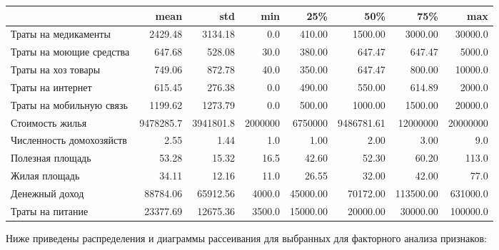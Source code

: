 \documentclass[12pt]{report}
\begin{document}
\begin{table}[H]
  \centering
  \begin{tabular}{lrrrrrrr}
    \toprule
    {} &        mean &         std &        min &         25\% &         50\% &         75\% &         max \\
    \midrule
    Траты на медикаменты       &     2429.48 &     3134.18 &        0.0 &      410.00 &     1500.00 &     3000.00 &     30000.0 \\
    Траты на моющие средства &      647.68 &      528.08 &       30.0 &      380.00 &      647.47 &      647.47 &      5000.0 \\
    Траты на хоз товары &      749.06 &      872.78 &       40.0 &      350.00 &      647.47 &      800.00 &     10000.0 \\
    Траты на интернет                                       &      615.45 &      276.38 &        0.0 &      490.00 &      550.00 &      614.89 &      2000.0 \\
    Траты на мобильную связь                         &     1199.62 &     1273.79 &        0.0 &      500.00 &     1000.00 &     1500.00 &     20000.0 \\
    Стоимость жилья                                  &  9478285.7 &  3941801.8 &  2000000 &  6750000 &  9486781.61 &  12000000 &  20000000 \\
    Численность домохозяйств                                          &        2.55 &        1.44 &        1.0 &        1.00 &        2.00 &        3.00 &         9.0 \\
    Полезная площадь &       53.28 &       15.32 &       16.5 &       42.60 &       52.30 &       60.20 &       113.0 \\
    Жилая площадь &       34.11 &       12.16 &       11.0 &       26.55 &       32.00 &       42.00 &        77.0 \\
    Денежный доход                                                                                       &    88784.06 &    65912.56 &     4000.0 &    45000.00 &    70172.00 &   113500.00 &    631000.0 \\
    Траты на питание &    23377.69 &    12675.36 &     3500.0 &    15000.00 &    20000.00 &    30000.00 &    100000.0 \\
    \bottomrule
    \end{tabular}
\end{table}
\par 
Ниже приведены распределения и диаграммы рассеивания для выбранных для факторного анализа признаков:
\end{document}
